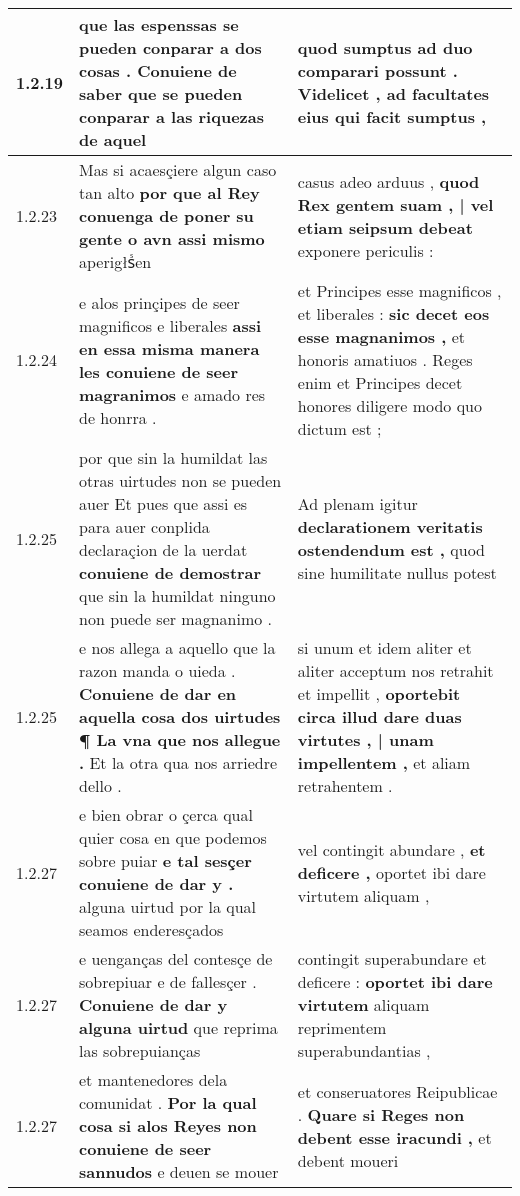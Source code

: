 \begin{tabular}{|p{1cm}|p{6.5cm}|p{6.5cm}|}
1.2.19 & que las espenssas se pueden conparar a dos cosas . \textbf{ Conuiene de saber que se pueden conparar a las riquezas } de aquel & quod sumptus ad duo comparari possunt . \textbf{ Videlicet , ad facultates eius } qui facit sumptus , \\\hline
1.2.23 & Mas si acaesçiere algun caso tan alto \textbf{ por que al Rey conuenga de poner su gente o avn assi mismo } aperigłsᷤen & casus adeo arduus , \textbf{ quod Rex gentem suam , | vel etiam seipsum debeat } exponere periculis : \\\hline
1.2.24 & e alos prinçipes de seer magnificos e liberales \textbf{ assi en essa misma manera les conuiene de seer magranimos } e amado res de honrra . & et Principes esse magnificos , et liberales : \textbf{ sic decet eos esse magnanimos , } et honoris amatiuos . Reges enim et Principes decet honores diligere modo quo dictum est ; \\\hline
1.2.25 & por que sin la humildat las otras uirtudes non se pueden auer Et pues que assi es para auer conplida declaraçion de la uerdat \textbf{ conuiene de demostrar } que sin la humildat ninguno non puede ser magnanimo . & Ad plenam igitur \textbf{ declarationem veritatis ostendendum est , } quod sine humilitate nullus potest \\\hline
1.2.25 & e nos allega a aquello que la razon manda o uieda . \textbf{ Conuiene de dar en aquella cosa dos uirtudes ¶ La vna que nos allegue . } Et la otra qua nos arriedre dello . & si unum et idem aliter et aliter acceptum nos retrahit et impellit , \textbf{ oportebit circa illud dare duas virtutes , | unam impellentem , } et aliam retrahentem . \\\hline
1.2.27 & e bien obrar o çerca qual quier cosa en que podemos sobre puiar \textbf{ e tal sesçer conuiene de dar y . } alguna uirtud por la qual seamos enderesçados & vel contingit abundare , \textbf{ et deficere , } oportet ibi dare virtutem aliquam , \\\hline
1.2.27 & e uenganças del contesçe de sobrepiuar e de fallesçer . \textbf{ Conuiene de dar y alguna uirtud } que reprima las sobrepuianças & contingit superabundare et deficere : \textbf{ oportet ibi dare virtutem } aliquam reprimentem superabundantias , \\\hline
1.2.27 & et mantenedores dela comunidat . \textbf{ Por la qual cosa si alos Reyes non conuiene de seer sannudos } e deuen se mouer & et conseruatores Reipublicae . \textbf{ Quare si Reges non debent esse iracundi , } et debent moueri \\\hline

\end{tabular}
